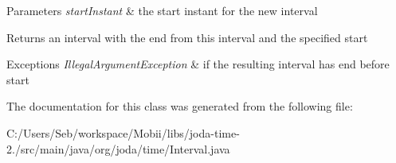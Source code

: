 \begin{DoxyParams}{Parameters}
{\em start\-Instant} & the start instant for the new interval \\
\hline
\end{DoxyParams}
\begin{DoxyReturn}{Returns}
an interval with the end from this interval and the specified start 
\end{DoxyReturn}

\begin{DoxyExceptions}{Exceptions}
{\em Illegal\-Argument\-Exception} & if the resulting interval has end before start \\
\hline
\end{DoxyExceptions}


The documentation for this class was generated from the following file\-:\begin{DoxyCompactItemize}
\item 
C\-:/\-Users/\-Seb/workspace/\-Mobii/libs/joda-\/time-\/2./src/main/java/org/joda/time/Interval.\-java\end{DoxyCompactItemize}
